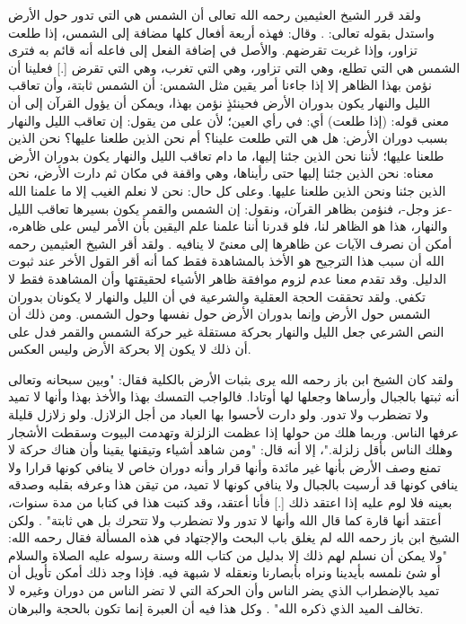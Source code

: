ولقد قرر الشيخ العثيمين رحمه الله تعالى أن الشمس هي التي تدور حول الأرض واستدل بقوله تعالى: \quranayah*[18][17][1-14] {\footnotesize (\surahname*[18])}. وقال: فهذه أربعة أفعال كلها مضافة إلى الشمس، إذا طلعت تزاور، وإذا غربت تقرضهم. والأصل في إضافة الفعل إلى فاعله أنه قائم به فترى الشمس هي التي تطلع، وهي التي تزاور، وهي التي تغرب، وهي التي تقرض [.] فعلينا أن نؤمن بهذا الظاهر إلا إذا جاءنا أمر يقين مثل الشمس: أن الشمس ثابتة، وأن تعاقب الليل والنهار يكون بدوران الأرض فحينئذٍ نؤمن بهذا، ويمكن أن يؤول القرآن إلى أن معنى قوله: (إذا طلعت) أي: في رأي العين؛ لأن على من يقول: إن تعاقب الليل والنهار بسبب دوران الأرض: هل هي التي طلعت علينا؟ أم نحن الذين طلعنا عليها؟ نحن الذين طلعنا عليها؛ لأننا نحن الذين جئنا إليها، ما دام تعاقب الليل والنهار يكون بدوران الأرض معناه: نحن الذين جئنا إليها حتى رأيناها، وهي واقفة في مكان ثم دارت الأرض، نحن الذين جئنا ونحن الذين طلعنا عليها. وعلى كل حال: نحن لا نعلم الغيب إلا ما علمنا الله -عز وجل-، فنؤمن بظاهر القرآن، ونقول: إن الشمس والقمر يكون بسيرها تعاقب الليل والنهار، هذا هو الظاهر لنا، فلو قدرنا أننا علمنا علم اليقين بأن الأمر ليس على ظاهره، أمكن أن نصرف الآيات عن ظاهرها إلى معنىً لا ينافيه \href{https://binothaimeen.net/ar/voice_library/lessonDetails/%D8%A7%D9%84%D8%A8%D8%AD%D8%AB/%D9%85%D8%B3%D8%A3%D9%84%D8%A9%20%D8%AF%D9%88%D8%B1%D8%A7%D9%86%20%D8%A7%D9%84%D8%B4%D9%85%D8%B3%20%D8%AD%D9%88%D9%84%20%D8%A7%D9%84%D8%A3%D8%B1%D8%B6/0eff5ba6-e968-4953-9475-fe75d23ab744}{\faExternalLink}. ولقد أقر الشيخ العثيمين رحمه الله أن سبب هذا الترجيح هو الأخذ بالمشاهدة فقط كما أنه أقر القول الأخر عند ثبوت الدليل. وقد تقدم معنا عدم لزوم موافقة ظاهر الأشياء لحقيقتها وأن المشاهدة فقط لا تكفي. ولقد تحققت الحجة العقلية والشرعية في أن الليل والنهار لا يكونان بدوران الشمس حول الأرض وإنما بدوران الأرض حول نفسها وحول الشمس. ومن ذلك أن النص الشرعي  جعل الليل والنهار بحركة مستقلة غير حركة الشمس والقمر فدل على أن ذلك لا يكون إلا بحركة الأرض وليس العكس.

ولقد كان الشيخ ابن باز رحمه الله يرى بثبات الأرض بالكلية فقال: "وبين سبحانه وتعالى أنه ثبتها بالجبال وأرساها وجعلها لها أوتادا. فالواجب التمسك بهذا والأخذ بهذا وأنها لا تميد ولا تضطرب ولا تدور. ولو دارت لأحسوا بها العباد من أجل الزلازل. ولو زلازل قليلة عرفها الناس. وربما هلك من حولها إذا عظمت الزلزلة وتهدمت البيوت وسقطت الأشجار وهلك الناس بأقل زلزلة."، إلا أنه قال: "ومن شاهد أشياء وتيقنها يقينا وأن هناك حركة لا تمنع وصف الأرض بأنها غير مائدة وأنها قرار وأنه دوران خاص لا ينافي كونها قرارا ولا ينافي كونها قد أرسيت بالجبال ولا ينافي كونها لا تميد، من تيقن هذا وعرفه بقلبه وصدقه بعينه فلا لوم عليه إذا اعتقد ذلك [.] فأنا أعتقد، وقد كتبت هذا في كتابا من مدة سنوات، أعتقد أنها قارة كما قال الله وأنها لا تدور ولا تضطرب ولا تتحرك بل هي ثابتة" \href{https://www.youtube.com/watch?v=nbzh7p2ZlFQ}{\faExternalLink}. ولكن الشيخ ابن باز رحمه الله لم يغلق باب البحث والإجتهاد في هذه المسألة فقال رحمه الله: "ولا يمكن أن نسلم لهم ذلك إلا بدليل من كتاب الله وسنة رسوله عليه الصلاة والسلام أو شئ نلمسه بأيدينا ونراه بأبصارنا ونعقله لا شبهة فيه. فإذا وجد ذلك أمكن تأويل أن تميد بالإضطراب الذي يضر الناس وأن الحركة التي لا تضر الناس من دوران وغيره لا تخالف الميد الذي ذكره الله" \href{https://www.youtube.com/watch?v=nbzh7p2ZlFQ}{\faExternalLink}. وكل هذا فيه أن العبرة إنما تكون بالحجة والبرهان.

